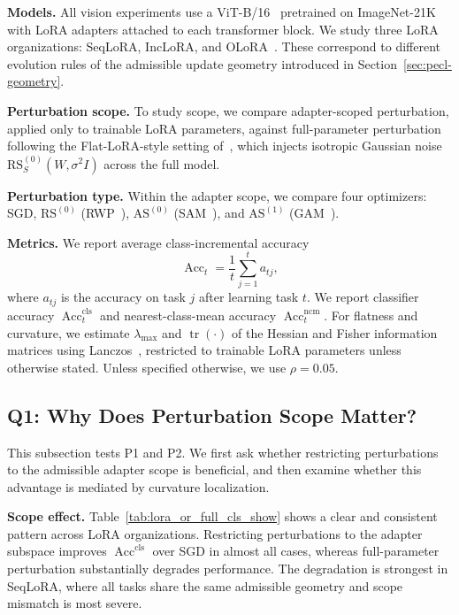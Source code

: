 \documentclass[10pt]{article} %
\begin{document}
\noindent\textbf{Models.}
All vision experiments use a ViT-B/16~\citep{dosovitskiy2020image} pretrained on ImageNet-21K with LoRA adapters attached to each transformer block.
We study three LoRA organizations: SeqLoRA, IncLoRA, and OLoRA~\citep{wang2023orthogonal}.
These correspond to different evolution rules of the admissible update geometry introduced in Section~\ref{sec:pecl-geometry}.

\noindent\textbf{Perturbation scope.}
To study scope, we compare adapter-scoped perturbation, applied only to trainable LoRA parameters, against full-parameter perturbation following the Flat-LoRA-style setting of~\citet{li2024flatlora}, which injects isotropic Gaussian noise $\mathrm{RS}_S^{(0)}(W,\sigma^2 I)$ across the full model.

\noindent\textbf{Perturbation type.}
Within the adapter scope, we compare four optimizers: SGD, $\mathrm{RS}^{(0)}$ (RWP~\citep{pmlr-v151-bisla22a}), $\mathrm{AS}^{(0)}$ (SAM~\citep{foretSharpnessAwareMinimizationEfficiently2021}), and $\mathrm{AS}^{(1)}$ (GAM~\citep{Zhang_GAM}).

\noindent\textbf{Metrics.}
We report average class-incremental accuracy
\[
\operatorname{Acc}_t = \frac{1}{t}\sum_{j=1}^{t} a_{tj},
\]
where $a_{tj}$ is the accuracy on task $j$ after learning task $t$.
We report classifier accuracy $\operatorname{Acc}_t^{\mathrm{cls}}$ and nearest-class-mean accuracy $\operatorname{Acc}_t^{\mathrm{ncm}}$.
For flatness and curvature, we estimate $\lambda_{\max}$ and $\operatorname{tr}(\cdot)$ of the Hessian and Fisher information matrices using Lanczos~\citep{ghorbaniInvestigationNeuralNet2019}, restricted to trainable LoRA parameters unless otherwise stated.
Unless specified otherwise, we use $\rho=0.05$.

\subsection{Q1: Why Does Perturbation Scope Matter?}
\label{sec:q1-scope}

This subsection tests P1 and P2.
We first ask whether restricting perturbations to the admissible adapter scope is beneficial, and then examine whether this advantage is mediated by curvature localization.

\noindent\textbf{Scope effect.}
Table~\ref{tab:lora_or_full_cls_show} shows a clear and consistent pattern across LoRA organizations.
Restricting perturbations to the adapter subspace improves $\operatorname{Acc}^{\mathrm{cls}}$ over SGD in almost all cases, whereas full-parameter perturbation substantially degrades performance.
The degradation is strongest in SeqLoRA, where all tasks share the same admissible geometry and scope mismatch is most severe.
\end{document}
